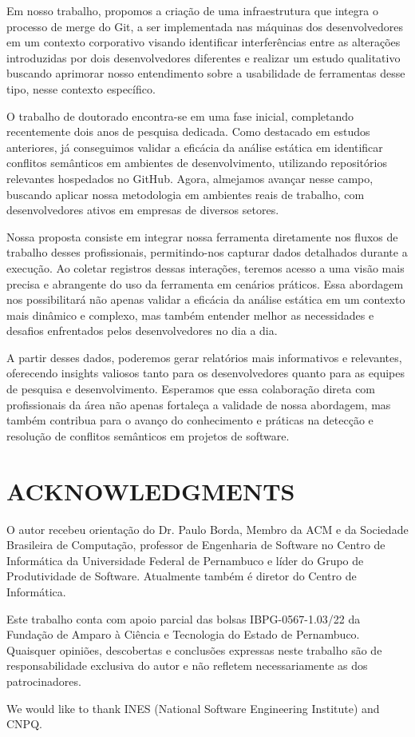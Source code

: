 \documentclass[sigconf,review]{acmart}
\begin{document}
Em nosso trabalho, propomos a criação de uma infraestrutura que integra o processo de merge do Git, a ser implementada nas máquinas dos desenvolvedores em um contexto corporativo visando identificar interferências entre as alterações introduzidas por dois desenvolvedores diferentes e realizar um estudo qualitativo buscando aprimorar nosso entendimento sobre a usabilidade de ferramentas desse tipo, nesse contexto específico.

O trabalho de doutorado encontra-se em uma fase inicial, completando recentemente dois anos de pesquisa dedicada. Como destacado em estudos anteriores, já conseguimos validar a eficácia da análise estática em identificar conflitos semânticos em ambientes de desenvolvimento, utilizando repositórios relevantes hospedados no GitHub. Agora, almejamos avançar nesse campo, buscando aplicar nossa metodologia em ambientes reais de trabalho, com desenvolvedores ativos em empresas de diversos setores.

Nossa proposta consiste em integrar nossa ferramenta diretamente nos fluxos de trabalho desses profissionais, permitindo-nos capturar dados detalhados durante a execução. Ao coletar registros dessas interações, teremos acesso a uma visão mais precisa e abrangente do uso da ferramenta em cenários práticos. Essa abordagem nos possibilitará não apenas validar a eficácia da análise estática em um contexto mais dinâmico e complexo, mas também entender melhor as necessidades e desafios enfrentados pelos desenvolvedores no dia a dia.

A partir desses dados, poderemos gerar relatórios mais informativos e relevantes, oferecendo insights valiosos tanto para os desenvolvedores quanto para as equipes de pesquisa e desenvolvimento. Esperamos que essa colaboração direta com profissionais da área não apenas fortaleça a validade de nossa abordagem, mas também contribua para o avanço do conhecimento e práticas na detecção e resolução de conflitos semânticos em projetos de software.

\section*{ACKNOWLEDGMENTS}
O autor recebeu orientação do Dr. Paulo Borda, Membro da ACM e da Sociedade Brasileira de Computação, professor de Engenharia de Software no Centro de Informática da Universidade Federal de Pernambuco e líder do Grupo de Produtividade de Software. Atualmente também é diretor do Centro de Informática.

Este trabalho conta com apoio parcial das bolsas IBPG-0567-1.03/22 da Fundação de Amparo à Ciência e Tecnologia do Estado de Pernambuco. Quaisquer opiniões, descobertas e conclusões expressas neste trabalho são de responsabilidade exclusiva do autor e não refletem necessariamente as dos patrocinadores.

We would like to thank INES (National Software Engineering Institute) and CNPQ.




\end{document}
